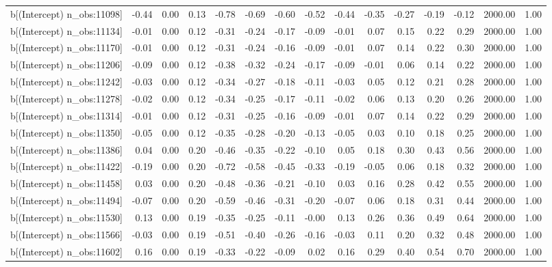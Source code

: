 \begin{table}[ht]
\begin{tabular}{rrrrrrrrrrrrrrr}
  b[(Intercept) n\_obs:11098] & -0.44 & 0.00 & 0.13 & -0.78 & -0.69 & -0.60 & -0.52 & -0.44 & -0.35 & -0.27 & -0.19 & -0.12 & 2000.00 & 1.00 \\ 
  b[(Intercept) n\_obs:11134] & -0.01 & 0.00 & 0.12 & -0.31 & -0.24 & -0.17 & -0.09 & -0.01 & 0.07 & 0.15 & 0.22 & 0.29 & 2000.00 & 1.00 \\ 
  b[(Intercept) n\_obs:11170] & -0.01 & 0.00 & 0.12 & -0.31 & -0.24 & -0.16 & -0.09 & -0.01 & 0.07 & 0.14 & 0.22 & 0.30 & 2000.00 & 1.00 \\ 
  b[(Intercept) n\_obs:11206] & -0.09 & 0.00 & 0.12 & -0.38 & -0.32 & -0.24 & -0.17 & -0.09 & -0.01 & 0.06 & 0.14 & 0.22 & 2000.00 & 1.00 \\ 
  b[(Intercept) n\_obs:11242] & -0.03 & 0.00 & 0.12 & -0.34 & -0.27 & -0.18 & -0.11 & -0.03 & 0.05 & 0.12 & 0.21 & 0.28 & 2000.00 & 1.00 \\ 
  b[(Intercept) n\_obs:11278] & -0.02 & 0.00 & 0.12 & -0.34 & -0.25 & -0.17 & -0.11 & -0.02 & 0.06 & 0.13 & 0.20 & 0.26 & 2000.00 & 1.00 \\ 
  b[(Intercept) n\_obs:11314] & -0.01 & 0.00 & 0.12 & -0.31 & -0.25 & -0.16 & -0.09 & -0.01 & 0.07 & 0.14 & 0.22 & 0.29 & 2000.00 & 1.00 \\ 
  b[(Intercept) n\_obs:11350] & -0.05 & 0.00 & 0.12 & -0.35 & -0.28 & -0.20 & -0.13 & -0.05 & 0.03 & 0.10 & 0.18 & 0.25 & 2000.00 & 1.00 \\ 
  b[(Intercept) n\_obs:11386] & 0.04 & 0.00 & 0.20 & -0.46 & -0.35 & -0.22 & -0.10 & 0.05 & 0.18 & 0.30 & 0.43 & 0.56 & 2000.00 & 1.00 \\ 
  b[(Intercept) n\_obs:11422] & -0.19 & 0.00 & 0.20 & -0.72 & -0.58 & -0.45 & -0.33 & -0.19 & -0.05 & 0.06 & 0.18 & 0.32 & 2000.00 & 1.00 \\ 
  b[(Intercept) n\_obs:11458] & 0.03 & 0.00 & 0.20 & -0.48 & -0.36 & -0.21 & -0.10 & 0.03 & 0.16 & 0.28 & 0.42 & 0.55 & 2000.00 & 1.00 \\ 
  b[(Intercept) n\_obs:11494] & -0.07 & 0.00 & 0.20 & -0.59 & -0.46 & -0.31 & -0.20 & -0.07 & 0.06 & 0.18 & 0.31 & 0.44 & 2000.00 & 1.00 \\ 
  b[(Intercept) n\_obs:11530] & 0.13 & 0.00 & 0.19 & -0.35 & -0.25 & -0.11 & -0.00 & 0.13 & 0.26 & 0.36 & 0.49 & 0.64 & 2000.00 & 1.00 \\ 
  b[(Intercept) n\_obs:11566] & -0.03 & 0.00 & 0.19 & -0.51 & -0.40 & -0.26 & -0.16 & -0.03 & 0.11 & 0.20 & 0.32 & 0.48 & 2000.00 & 1.00 \\ 
  b[(Intercept) n\_obs:11602] & 0.16 & 0.00 & 0.19 & -0.33 & -0.22 & -0.09 & 0.02 & 0.16 & 0.29 & 0.40 & 0.54 & 0.70 & 2000.00 & 1.00 \\ 

\end{tabular}
\end{table}
